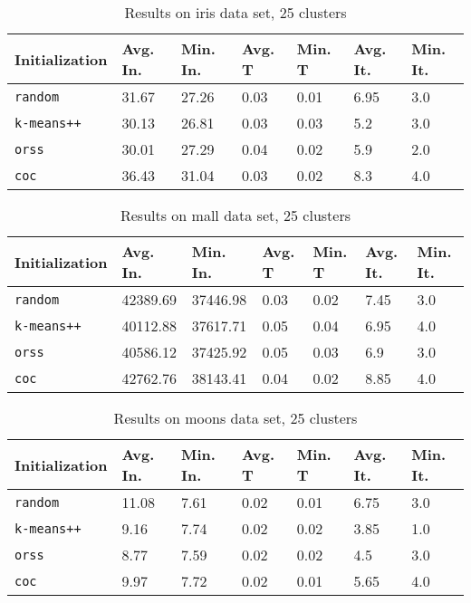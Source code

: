 \begin{table}[h]
	\begin{center}
		\begin{tabular}{|l|l|l|l|l|l|l|}
			\hline
			Initialization & Avg. In. & Min. In. & Avg. T & Min. T & Avg. It. & Min. It.\\\hline
			\texttt{random} & 31.67 & 27.26 & 0.03 & 0.01 & 6.95 & 3.0\\\hline
			\texttt{k-means++} & 30.13 & 26.81 & 0.03 & 0.03 & 5.2 & 3.0\\\hline
			\texttt{orss} & 30.01 & 27.29 & 0.04 & 0.02 & 5.9 & 2.0\\\hline
			\texttt{coc} & 36.43 & 31.04 & 0.03 & 0.02 & 8.3 & 4.0\\\hline
		\end{tabular}
		\caption{Results on iris data set, 25 clusters}
		\label{tbl:iris25}
	\end{center}
\end{table}

\begin{table}[h]
	\begin{center}
		\begin{tabular}{|l|l|l|l|l|l|l|}
			\hline
			Initialization & Avg. In. & Min. In. & Avg. T & Min. T & Avg. It. & Min. It.\\\hline
			\texttt{random} & 42389.69 & 37446.98 & 0.03 & 0.02 & 7.45 & 3.0\\\hline
			\texttt{k-means++} & 40112.88 & 37617.71 & 0.05 & 0.04 & 6.95 & 4.0\\\hline
			\texttt{orss} & 40586.12 & 37425.92 & 0.05 & 0.03 & 6.9 & 3.0\\\hline
			\texttt{coc} & 42762.76 & 38143.41 & 0.04 & 0.02 & 8.85 & 4.0\\\hline
		\end{tabular}
		\caption{Results on mall data set, 25 clusters}
		\label{tbl:mall25}
	\end{center}
\end{table}

\begin{table}[h]
	\begin{center}
		\begin{tabular}{|l|l|l|l|l|l|l|}
			\hline
			Initialization & Avg. In. & Min. In. & Avg. T & Min. T & Avg. It. & Min. It.\\\hline
			\texttt{random} & 11.08 & 7.61 & 0.02 & 0.01 & 6.75 & 3.0\\\hline
			\texttt{k-means++} & 9.16 & 7.74 & 0.02 & 0.02 & 3.85 & 1.0\\\hline
			\texttt{orss} & 8.77 & 7.59 & 0.02 & 0.02 & 4.5 & 3.0\\\hline
			\texttt{coc} & 9.97 & 7.72 & 0.02 & 0.01 & 5.65 & 4.0\\\hline
		\end{tabular}
		\caption{Results on moons data set, 25 clusters}
		\label{tbl:moons25}
	\end{center}
\end{table}

